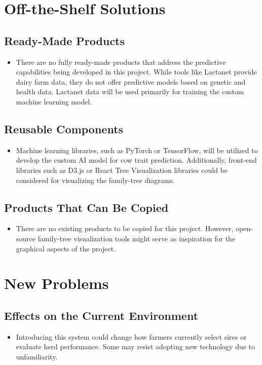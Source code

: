 \documentclass[12pt]{article}
\begin{document}
\section{Off-the-Shelf Solutions}
\subsection{Ready-Made Products}
\begin{itemize}
	\item There are no fully ready-made products that address the predictive
	      capabilities being developed in this project. While tools like Lactanet
	      provide dairy farm data, they do not offer predictive models based on
	      genetic and health data. Lactanet data will be used primarily for
	      training the custom machine learning model.
\end{itemize}
\subsection{Reusable Components}
\begin{itemize}
	\item Machine learning libraries, such as PyTorch or TensorFlow, will be
	      utilized to develop the custom AI model for cow trait prediction.
	      Additionally, front-end libraries such as D3.js or React Tree
	      Visualization libraries could be considered for visualizing the
	      family-tree diagrams.
\end{itemize}
\subsection{Products That Can Be Copied}
\begin{itemize}
	\item There are no existing products to be copied for this project. However,
	      open-source family-tree visualization tools might serve as inspiration
	      for the graphical aspects of the project.
\end{itemize}

\section{New Problems}
\subsection{Effects on the Current Environment}
\begin{itemize}
	\item Introducing this system could change how farmers currently select sires
	      or evaluate herd performance. Some may resist adopting new technology
	      due to unfamiliarity.
\end{itemize}
\end{document}
